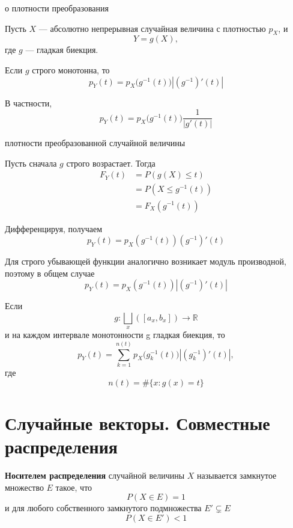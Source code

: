 \documentclass[12pt,a4paper]{article}
\begin{document}
\begin{theorem}{о плотности преобразования}

Пусть $X$ --- абсолютно непрерывная случайная величина с плотностью $p_X$, и
\[
Y=g(X),
\]
где $g$ --- гладкая биекция.

Если $g$ строго монотонна, то
\[
p_Y(t)
=
p_X\bigl(g^{-1}(t)\bigr)
\left|
\left(g^{-1}\right)'(t)
\right|
\]

В частности,
\[
p_Y(t)
=
p_X\bigl(g^{-1}(t)\bigr)
\frac{1}{\left|g'(t)\right|}
\]

\end{theorem}

\begin{proofbox}{плотности преобразованной случайной величины}

Пусть сначала $g$ строго возрастает. Тогда
\[
\begin{aligned}
F_Y(t)
&=
P(g(X)\leq t)\\
&=
P(X\leq g^{-1}(t))\\
&=
F_X(g^{-1}(t))
\end{aligned}
\]

Дифференцируя, получаем
\[
p_Y(t)
=
p_X(g^{-1}(t))
\left(g^{-1}\right)'(t)
\]

Для строго убывающей функции аналогично возникает модуль производной, поэтому в общем случае
\[
p_Y(t)
=
p_X(g^{-1}(t))
\left|
\left(g^{-1}\right)'(t)
\right|
\]

\end{proofbox}

Если
\[
g: \bigsqcup_x([a_x, b_x])\longrightarrow \mathbb{R}
\]
и на каждом интервале монотонности g гладкая биекция, то
\[
p_Y(t)
=
\sum_{k=1}^{n(t)}
p_X\bigl(g_k^{-1}(t)\bigr)
\left|
\left(g_k^{-1}\right)'(t)
\right|,
\]
где
\[
n(t)=\#\{x:g(x)=t\}
\]

\newpage

\section{Случайные векторы. Совместные распределения}

\begin{definition}

\textbf{Носителем распределения} случайной величины $X$ называется замкнутое множество $E$ такое, что
\[
P(X\in E)=1
\]
и для любого собственного замкнутого подмножества $E'\subsetneq E$
\[
P(X\in E')<1
\]

\end{definition}
\end{document}

